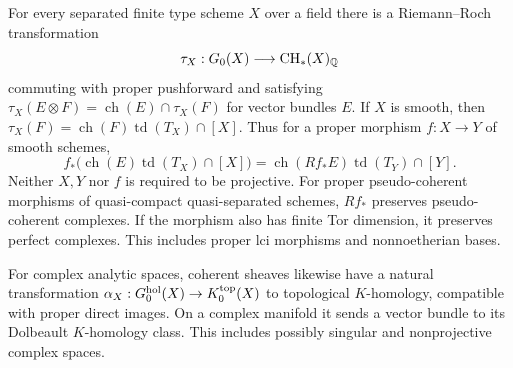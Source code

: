 \begin{theorem}\label{thm:B3-riemann-roch}
For every separated finite type scheme $X$ over a field there is a
Riemann--Roch transformation
\[
 \tau_X:G_0(X)\longrightarrow\mathrm{CH}_*(X)_{\mathbb{Q}}
\]
commuting with proper pushforward and satisfying
$\tau_X(E\otimes F)=\operatorname{ch}(E)\cap\tau_X(F)$ for vector
bundles $E$. If $X$ is smooth, then
$\tau_X(F)=\operatorname{ch}(F)\operatorname{td}(T_X)\cap[X]$.
Thus for a proper morphism $f:X\to Y$ of smooth schemes,
\[
 f_*\bigl(\operatorname{ch}(E)\operatorname{td}(T_X)\cap[X]\bigr)
 =\operatorname{ch}(Rf_*E)\operatorname{td}(T_Y)\cap[Y].
\]
Neither $X,Y$ nor $f$ is required to be projective.
For proper pseudo-coherent morphisms of quasi-compact
quasi-separated schemes, $Rf_*$ preserves pseudo-coherent complexes.
If the morphism also has finite Tor dimension, it preserves perfect
complexes. This includes proper lci morphisms and nonnoetherian bases.

For complex analytic spaces, coherent sheaves likewise have a natural
transformation $\alpha_X:G_0^{\rm hol}(X)\to K^{\rm top}_0(X)$ to
topological $K$-homology, compatible with proper direct images.
On a complex manifold it sends a vector bundle to its Dolbeault
$K$-homology class. This includes possibly singular and nonprojective
complex spaces.
\end{theorem}
